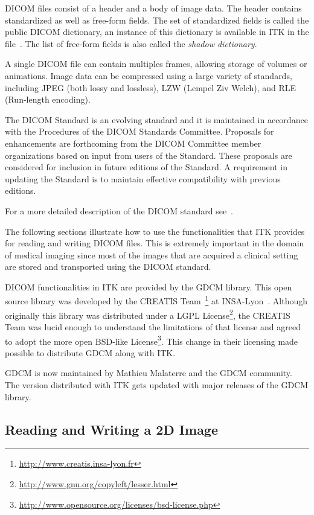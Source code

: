 DICOM files consist of a header and a body of image data. The header contains
standardized as well as free-form fields. The set of standardized fields is
called the public DICOM dictionary, an instance of this dictionary is available
in ITK in the file~.  The list of
free-form fields is also called the \emph{shadow dictionary}.

A single DICOM file can contain multiples frames, allowing storage of volumes
or animations. Image data can be compressed using a large variety of standards,
including JPEG (both lossy and lossless), LZW (Lempel Ziv Welch), and RLE
(Run-length encoding).

The DICOM Standard is an evolving standard and it is maintained in accordance
with the Procedures of the DICOM Standards Committee. Proposals for
enhancements are forthcoming from the DICOM Committee member organizations
based on input from users of the Standard. These proposals are considered for
inclusion in future editions of the Standard. A requirement in updating the
Standard is to maintain effective compatibility with previous editions.

For a more detailed description of the DICOM standard see~\cite{DICOMStandard}.

The following sections illustrate how to use the functionalities that ITK
provides for reading and writing DICOM files. This is extremely important in
the domain of medical imaging since most of the images that are acquired a
clinical setting are stored and transported using the DICOM standard.

DICOM functionalities in ITK are provided by the GDCM library. This open source
library was developed by the CREATIS
Team~\footnote{\url{http://www.creatis.insa-lyon.fr}} at
INSA-Lyon~\cite{CreatisINSA-Lyon}.  Although originally this library was
distributed under a LGPL
License\footnote{\url{http://www.gnu.org/copyleft/lesser.html}}, the CREATIS Team was
lucid enough to understand the limitations of that license and agreed to adopt
the more open BSD-like
License\footnote{\url{http://www.opensource.org/licenses/bsd-license.php}}.
This change in their licensing made possible to distribute GDCM
along with ITK.

GDCM is now maintained by Mathieu Malaterre and the GDCM community.
The version distributed with ITK gets updated with major releases of the GDCM
library.

\subsection{Reading and Writing a 2D Image}
\label{DicomImageReadWrite}


